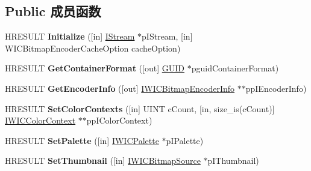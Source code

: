 \subsection*{Public 成员函数}
\begin{DoxyCompactItemize}
\item 
\mbox{\label{interface_i_w_i_c_bitmap_encoder_abe5af93633566def15b51a226f86398d}} 
H\+R\+E\+S\+U\+LT {\bfseries Initialize} (\mbox{[}in\mbox{]} \hyperlink{interface_i_stream}{I\+Stream} $\ast$p\+I\+Stream, \mbox{[}in\mbox{]} W\+I\+C\+Bitmap\+Encoder\+Cache\+Option cache\+Option)
\item 
\mbox{\label{interface_i_w_i_c_bitmap_encoder_ac12810bb3bbdd38dbc15ee37b885c81e}} 
H\+R\+E\+S\+U\+LT {\bfseries Get\+Container\+Format} (\mbox{[}out\mbox{]} \hyperlink{interface_g_u_i_d}{G\+U\+ID} $\ast$pguid\+Container\+Format)
\item 
\mbox{\label{interface_i_w_i_c_bitmap_encoder_abefbd3b705608dd7f75497ebe6b1e5ff}} 
H\+R\+E\+S\+U\+LT {\bfseries Get\+Encoder\+Info} (\mbox{[}out\mbox{]} \hyperlink{interface_i_w_i_c_bitmap_encoder_info}{I\+W\+I\+C\+Bitmap\+Encoder\+Info} $\ast$$\ast$pp\+I\+Encoder\+Info)
\item 
\mbox{\label{interface_i_w_i_c_bitmap_encoder_a74f6584cf3397636e3fecf51bc5fafb3}} 
H\+R\+E\+S\+U\+LT {\bfseries Set\+Color\+Contexts} (\mbox{[}in\mbox{]} U\+I\+NT c\+Count, \mbox{[}in, size\+\_\+is(c\+Count)\mbox{]} \hyperlink{interface_i_w_i_c_color_context}{I\+W\+I\+C\+Color\+Context} $\ast$$\ast$pp\+I\+Color\+Context)
\item 
\mbox{\label{interface_i_w_i_c_bitmap_encoder_a9212363d46ae5c6251e9a542466666f6}} 
H\+R\+E\+S\+U\+LT {\bfseries Set\+Palette} (\mbox{[}in\mbox{]} \hyperlink{interface_i_w_i_c_palette}{I\+W\+I\+C\+Palette} $\ast$p\+I\+Palette)
\item 
\mbox{\label{interface_i_w_i_c_bitmap_encoder_ab1e4ff415591853c4033ece322bf95f6}} 
H\+R\+E\+S\+U\+LT {\bfseries Set\+Thumbnail} (\mbox{[}in\mbox{]} \hyperlink{interface_i_w_i_c_bitmap_source}{I\+W\+I\+C\+Bitmap\+Source} $\ast$p\+I\+Thumbnail)
\item 

\end{DoxyCompactItemize}
